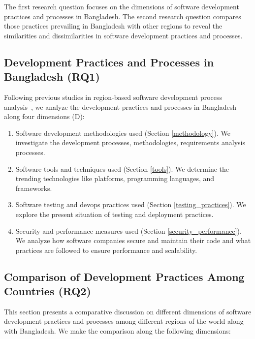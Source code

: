 The first research question focuses on the dimensions of software development
practices and processes in Bangladesh. The second research question compares those
practices prevailing in Bangladesh with other regions to reveal the similarities
and dissimilarities in software development practices and processes.

\subsection{Development Practices and Processes in Bangladesh (RQ1)}
\label{RQ1}
Following previous studies in region-based software development process analysis~\citep{Garousi2013, Garousi2015, Vonken2012, Wang2018}, we 
analyze the development practices and processes in Bangladesh along four dimensions (D):
\begin{enumerate}[label=D\arabic{*}., leftmargin=20pt]
  \item Software development methodologies used (Section \ref{methodology}). We investigate the development
processes, methodologies, requirements analysis processes.
  \item Software tools and techniques used (Section \ref{tools}). We determine the
trending technologies like platforms, programming languages, and frameworks.
\item Software testing and devops practices used (Section \ref{testing_practices}). We explore the
present situation of testing and deployment practices.
\item Security and performance measures used (Section \ref{security_performance}). We analyze how
software companies secure and maintain their code and what practices are
followed to ensure performance and scalability.
\end{enumerate}






\subsection{Comparison of Development Practices Among Countries (RQ2)}
\label{RQ2}

This section presents a comparative discussion on different dimensions of software development practices and processes among different regions of the world along with Bangladesh. We make the comparison along the following dimensions:


